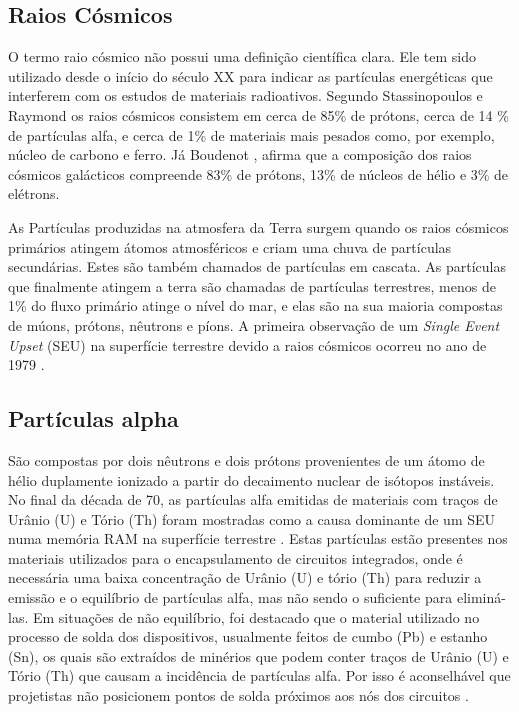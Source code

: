 \subsection{Raios Cósmicos} \label{subsec:raiosCosmicos}

O termo raio cósmico não possui uma definição científica clara. Ele tem sido utilizado desde o início do século XX para indicar as partículas energéticas que interferem com os estudos de materiais radioativos. Segundo Stassinopoulos e Raymond \cite{Stassinopoulos:1988} os raios cósmicos consistem em cerca de 85\% de prótons, cerca de 14 \% de partículas alfa, e cerca de 1\% de materiais mais pesados como, por exemplo, núcleo de carbono e ferro. Já Boudenot \cite{Boudenot:2007}, afirma que a composição dos raios cósmicos galácticos compreende 83\% de prótons, 13\% de núcleos de hélio e 3\% de elétrons. 

As Partículas produzidas na atmosfera da Terra surgem quando os raios cósmicos primários atingem átomos atmosféricos e criam uma chuva de partículas secundárias. Estes são também chamados de partículas em cascata. As partículas que finalmente atingem a terra são chamadas de partículas terrestres, menos de 1\% do fluxo primário atinge o nível do mar, e elas são na sua maioria compostas de múons, prótons, nêutrons e píons. A primeira observação de um \textit{Single Event Upset} (SEU) na superfície terrestre devido a raios cósmicos ocorreu no ano de 1979 \cite{ZieglerLandFord:1979}.


\subsection{Partículas alpha}

São compostas por dois nêutrons e dois prótons provenientes de um átomo de hélio duplamente ionizado a partir do decaimento nuclear de isótopos instáveis. No final da década de 70, as partículas alfa emitidas de materiais com traços de Urânio (U) e Tório (Th) foram mostradas como a causa dominante de um SEU numa memória RAM na superfície terrestre \cite{Woods:1978}. Estas partículas estão presentes nos materiais utilizados para o encapsulamento de circuitos integrados, onde é necessária uma baixa concentração de Urânio (U) e tório (Th) para reduzir a emissão e o equilíbrio de partículas alfa, mas não sendo o suficiente para eliminá-las. Em situações de não equilíbrio, foi destacado que o material utilizado no processo de solda dos dispositivos, usualmente feitos de cumbo (Pb) e estanho (Sn), os quais são extraídos de minérios que podem conter traços de Urânio (U) e Tório (Th) que causam a incidência de partículas alfa. Por isso é aconselhável que projetistas não posicionem pontos de solda próximos aos nós dos circuitos \cite{Velazco:2007}.


